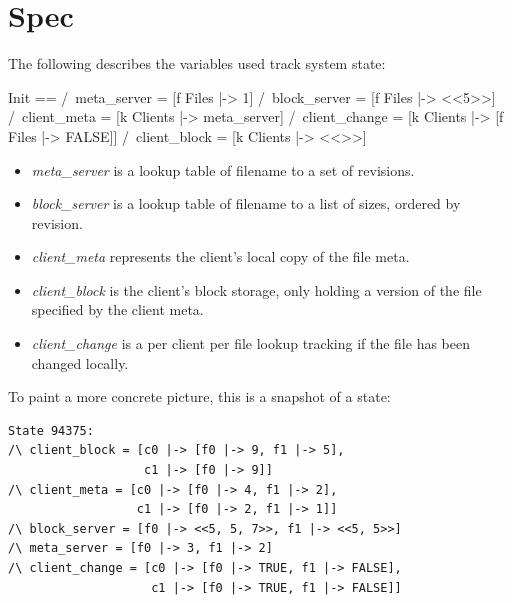 \section{Spec}

The following describes the variables used track system state:\\
\begin{tla}
Init ==
    /\ meta_server = [f \in Files |-> {1}]                 
    /\ block_server = [f \in Files |-> <<5>>]
    /\ client_meta = [k \in Clients |-> meta_server]
    /\ client_change = [k \in Clients |-> [f \in Files |-> FALSE]]
    /\ client_block = [k \in Clients |-> <<>>]
\end{tla}
\begin{tlatex}
%
\end{tlatex}

\begin{itemize}
    \item \textit{meta\_server} is a lookup table of filename to a set of revisions.
    \item \textit{block\_server} is a lookup table of filename to a list of sizes, ordered by revision.
    \item \textit{client\_meta} represents the client's local copy of the file meta.
    \item \textit{client\_block} is the client's block storage, only holding a version of the file specified by the client meta.
    \item \textit{client\_change} is a per client per file lookup tracking if the file has been changed locally.
\end{itemize}

To paint a more concrete picture, this is a snapshot of a state:
\begin{verbatim}
State 94375:
/\ client_block = [c0 |-> [f0 |-> 9, f1 |-> 5], 
                   c1 |-> [f0 |-> 9]]
/\ client_meta = [c0 |-> [f0 |-> 4, f1 |-> 2], 
                  c1 |-> [f0 |-> 2, f1 |-> 1]]
/\ block_server = [f0 |-> <<5, 5, 7>>, f1 |-> <<5, 5>>]
/\ meta_server = [f0 |-> 3, f1 |-> 2]
/\ client_change = [c0 |-> [f0 |-> TRUE, f1 |-> FALSE], 
                    c1 |-> [f0 |-> TRUE, f1 |-> FALSE]]
\end{verbatim}


